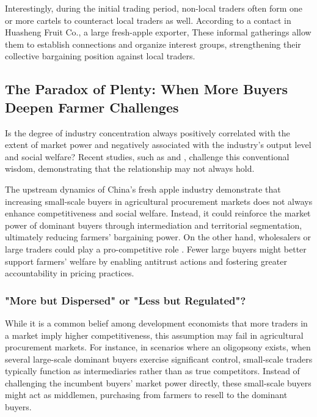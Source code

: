 Interestingly, during the initial trading period, non-local traders often form one or more cartels to counteract local traders as well. According to a contact in Huasheng Fruit Co., a large fresh-apple exporter,  These informal gatherings allow them to establish connections and organize interest groups, strengthening their collective bargaining position against local traders.







\subsection{The Paradox of Plenty: When More Buyers Deepen Farmer Challenges}
Is the degree of industry concentration always positively correlated with the extent of market power and negatively associated with the industry’s output level and social welfare? Recent studies, such as \cite{merel2017buyer} and \cite{crespi2012competition}, challenge this conventional wisdom, demonstrating that the relationship may not always hold.

The upstream dynamics of China's fresh apple industry demonstrate that increasing small-scale buyers in agricultural procurement markets does not always enhance competitiveness and social welfare. Instead, it could reinforce the market power of dominant buyers through intermediation and territorial segmentation, ultimately reducing farmers' bargaining power. On the other hand, wholesalers or large traders could play a pro-competitive role \citep{Belton_et_al_2024}. Fewer large buyers might better support farmers' welfare by enabling antitrust actions and fostering greater accountability in pricing practices.


\subsubsection{"More but Dispersed" or "Less but Regulated"?}
While it is a common belief among development economists that more traders in a market imply higher competitiveness, this assumption may fail in agricultural procurement markets. For instance, in scenarios where an oligopsony exists, when several large-scale dominant buyers exercise significant control, small-scale traders typically function as intermediaries rather than as true competitors. Instead of challenging the incumbent buyers' market power directly, these small-scale buyers might act as middlemen, purchasing from farmers to resell to the dominant buyers. 

